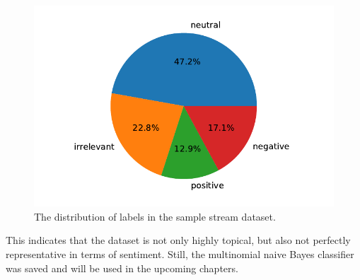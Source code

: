 \begin{figure}
    \centering
    \caption{The distribution of labels in the sample stream dataset.}
    \label{fig:sample_sentiment}
    \includegraphics[width=12cm]{../figures/sample_sentiment.pdf}
\end{figure}

This indicates that the dataset is not only highly topical, but also not perfectly representative in terms of sentiment.
Still, the multinomial naive Bayes classifier was saved and will be used in the upcoming chapters.
